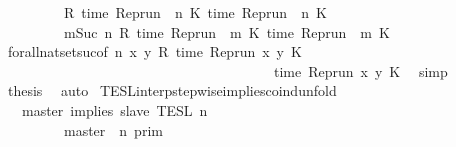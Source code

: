 \begin{isabellebody}
\ \ \ \ \ \ \ {\isacharequal}\ {\isacharbraceleft}{\isasymrho}{\isachardot}\ R\ {\isacharparenleft}time\ {\isacharparenleft}{\isacharparenleft}Rep{\isacharunderscore}run\ {\isasymrho}{\isacharparenright}\ n\ K\ time\ {\isacharparenleft}{\isacharparenleft}Rep{\isacharunderscore}run\ {\isasymrho}{\isacharparenright}\ n\ K\isanewline
\ \ \ \ \ \ \ {\isasyminter}\ {\isacharbraceleft}{\isasymrho}{\isachardot}\ {\isasymforall}m{\isasymge}Suc\ n{\isachardot}\ R\ {\isacharparenleft}time\ {\isacharparenleft}{\isacharparenleft}Rep{\isacharunderscore}run\ {\isasymrho}{\isacharparenright}\ m\ K\ time\ {\isacharparenleft}{\isacharparenleft}Rep{\isacharunderscore}run\ {\isasymrho}{\isacharparenright}\ m\ K\isanewline
\ \ \ \ \isamarkupfalse%
\ forall{\isacharunderscore}nat{\isacharunderscore}set{\isacharunderscore}suc{\isacharbrackleft}of\ {\isacartoucheopen}n{\isacartoucheclose}\ {\isacartoucheopen}{\isasymlambda}x\ y{\isachardot}\ R\ {\isacharparenleft}time\ {\isacharparenleft}{\isacharparenleft}Rep{\isacharunderscore}run\ x{\isacharparenright}\ y\ K\isanewline
\ \ \ \ \ \ \ \ \ \ \ \ \ \ \ \ \ \ \ \ \ \ \ \ \ \ \ \ \ \ \ \ \ \ \ \ \ \ \ time\ {\isacharparenleft}{\isacharparenleft}Rep{\isacharunderscore}run\ x{\isacharparenright}\ y\ K\ \isamarkupfalse%
\ simp\isanewline
\ \ \isamarkupfalse%
\ {\isacharquery}thesis\ \isamarkupfalse%
\ auto\isanewline
{}\isamarkupfalse%
%
\endisatagproof
{\isafoldproof}%
%
\isadelimproof
\isanewline
%
\endisadelimproof
\isanewline
{}\isamarkupfalse%
\ TESL{\isacharunderscore}interp{\isacharunderscore}stepwise{\isacharunderscore}implies{\isacharunderscore}coind{\isacharunderscore}unfold{\isacharcolon}\isanewline
\ \ {\isacartoucheopen}{\isasymlbrakk}\ master\ implies\ slave\ {\isasymrbrakk}\isactrlsub T\isactrlsub E\isactrlsub S\isactrlsub L\isactrlbsup {\isasymge}\ n\isactrlesup \ {\isacharequal}\isanewline
\ \ \ \ \ {\isacharparenleft}\ \ \ {\isasymlbrakk}\ master\ {\isasymnot}{\isasymUp}\ n\ {\isasymrbrakk}\isactrlsub p\isactrlsub r\isactrlsub i\isactrlsub m\ \ \ \ \ \ \ \ \ \ \ \ \ \ \ \ \ \ \ \ \ %

\end{isabellebody}
